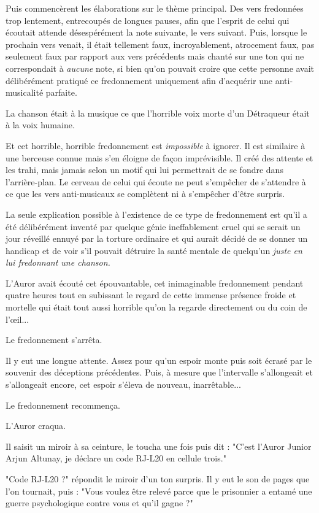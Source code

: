 Puis commencèrent les élaborations sur le thème principal. Des vers fredonnées trop lentement, entrecoupés de longues pauses, afin que l'esprit de celui qui écoutait attende désespérément la note suivante, le vers suivant. Puis, lorsque le prochain vers venait, il était tellement faux, incroyablement, atrocement faux, pas seulement faux par rapport aux vers précédents mais chanté sur une ton qui ne correspondait à \emph{aucune}  note, si bien qu'on pouvait croire que cette personne avait délibérément pratiqué ce fredonnement uniquement afin d'acquérir une anti-musicalité parfaite.

La chanson était à la musique ce que l'horrible voix morte d'un Détraqueur était à la voix humaine.

Et cet horrible, horrible fredonnement est \emph{impossible}  à ignorer. Il est similaire à une berceuse connue mais s'en éloigne de façon imprévisible. Il créé des attente et les trahi, mais jamais selon un motif qui lui permettrait de se fondre dans l'arrière-plan. Le cerveau de celui qui écoute ne peut s'empêcher de s'attendre à ce que les vers anti-musicaux se complètent ni à s'empêcher d'être surpris.

La seule explication possible à l'existence de ce type de fredonnement est qu'il a été délibérément inventé par quelque génie ineffablement cruel qui se serait un jour réveillé ennuyé par la torture ordinaire et qui aurait décidé de se donner un handicap et de voir s'il pouvait détruire la santé mentale de quelqu'un \emph{juste en lui fredonnant une chanson.} 

L'Auror avait écouté cet épouvantable, cet inimaginable fredonnement pendant quatre heures tout en subissant le regard de cette immense présence froide et mortelle qui était tout aussi horrible qu'on la regarde directement ou du coin de l'œil...

Le fredonnement s'arrêta.

Il y eut une longue attente. Assez pour qu'un espoir monte puis soit écrasé par le souvenir des déceptions précédentes. Puis, à mesure que l'intervalle s'allongeait et s'allongeait encore, cet espoir s'éleva de nouveau, inarrêtable...

Le fredonnement recommença.

L'Auror craqua.

Il saisit un miroir à sa ceinture, le toucha une fois puis dit : "C'est l'Auror Junior Arjun Altunay, je déclare un code RJ-L20 en cellule trois."

"Code RJ-L20 ?" répondit le miroir d'un ton surpris. Il y eut le son de pages que l'on tournait, puis : "Vous voulez être relevé parce que le prisonnier a entamé une guerre psychologique contre vous et qu'il gagne ?"

